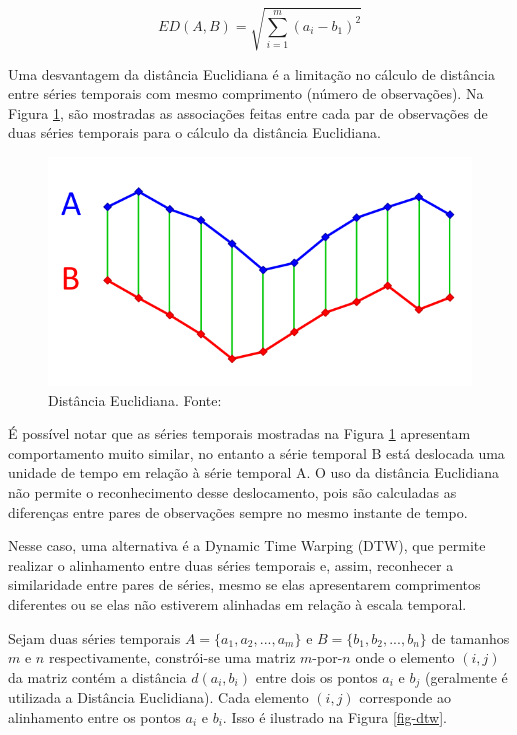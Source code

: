 \begin{equation}
ED(A,B) = \sqrt{\sum_{i=1}^{m}(a_i - b_1)^2}
\end{equation}


Uma desvantagem da distância Euclidiana é a limitação no cálculo de distância entre séries temporais com mesmo comprimento (número de observações). Na Figura \ref{fig-distED}, são mostradas as associações feitas entre cada par de observações de duas séries temporais para o cálculo da distância Euclidiana.

\begin{figure}[H]
	\centering
	\includegraphics[scale=0.3]{pasta1_figuras/ED.png}
	\caption {Distância Euclidiana. Fonte: \cite{ferraz2016}}
	\label{fig-distED}
\end{figure}

É possível notar que as séries temporais mostradas na Figura \ref{fig-distED} apresentam comportamento muito similar, no entanto a série temporal B está deslocada uma unidade de tempo em relação à série temporal A. O uso da distância Euclidiana não permite o reconhecimento desse deslocamento, pois são calculadas as diferenças entre pares de observações sempre no mesmo instante de tempo.

Nesse caso, uma alternativa é a Dynamic Time Warping (DTW)\cite{Berndt:1994:UDT:3000850.3000887}, que permite realizar o alinhamento entre duas séries temporais e, assim, reconhecer a similaridade entre pares de séries, mesmo se elas apresentarem comprimentos diferentes ou se elas não estiverem alinhadas em relação à escala temporal. 

Sejam duas séries temporais $A = \{a_1,a_2,...,a_m \}$ e $B = \{b_1,b_2,...,b_n \}$  de tamanhos $m$ e $n$ respectivamente, constrói-se uma matriz $m$-por-$n$ onde o elemento $(i,j)$ da matriz contém a distância $d(a_i,b_i)$ entre dois os pontos $a_i$ e $b_j$ (geralmente é utilizada a Distância Euclidiana).  Cada elemento $(i,j)$ corresponde ao alinhamento entre os pontos $a_i$ e $b_i$. Isso é ilustrado na Figura \ref{fig-dtw}. 

